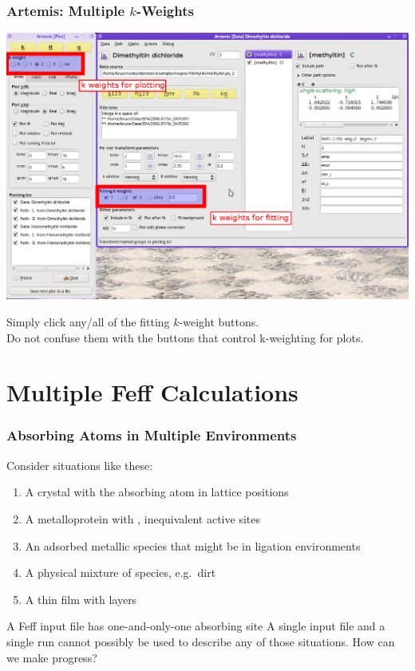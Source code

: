 \documentclass[10pt, xcolor=x11names, compress]{beamer}
\begin{document}
\begin{frame}
  \frametitle{Artemis: Multiple $k$-Weights}
  
  \begin{center}
    \includegraphics[width=0.9\linewidth]{artemis/mkw.png}

    Simply click any/all of the fitting $k$-weight buttons.\\
    Do not confuse them with the buttons that control k-weighting for
    plots.
  \end{center}
\end{frame}

\section[MFC]{Multiple Feff Calculations}
\begin{frame}
  \frametitle{Absorbing Atoms in Multiple Environments}

  Consider situations like these:
  \begin{enumerate}
  \item A crystal with the absorbing atom in {\multiple} lattice
    positions
  \item A metalloprotein with {\multiple}, inequivalent active sites
  \item An adsorbed metallic species that might be in {\multiple}
    ligation environments
  \item A physical mixture of {\multiple} species, e.g.\ dirt
  \item A thin film with {\multiple} layers
  \end{enumerate}

  \bigskip

  \begin{block}{A Feff input file has one-and-only-one absorbing
      site}
    A single {\feff} input file and a single {\feff} run cannot
    possibly be used to describe any of those situations.  How can we
    make progress?
  \end{block}
\end{frame}
\end{document}
